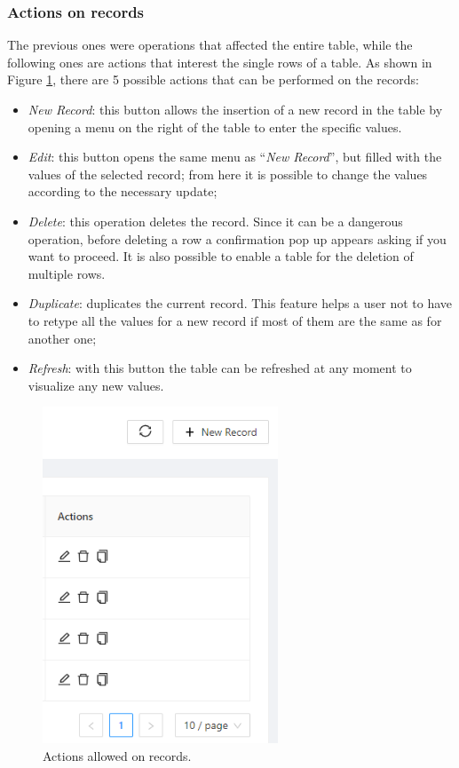 \subsubsection{Actions on records}
The previous ones were operations that affected the entire table, while the following ones are actions that interest the single rows of a table. As shown in Figure \ref{fig:actions}, there are 5 possible actions that can be performed on the records:
\begin{itemize}
    \item  \emph{New Record}:  this button allows the insertion of a new record in the table by opening a menu on the right of the table to enter the specific values.
    \item  \emph{Edit}: this button opens the same menu as ``\emph{New Record}'', but filled with the values of the selected record; from here it is possible to change the values according to the necessary update;
    \item  \emph{Delete}: this operation deletes the record. Since it can be a dangerous operation, before deleting a row a confirmation pop up appears asking if you want to proceed. It is also possible to enable a table for the deletion of multiple rows.
    \item  \emph{Duplicate}: duplicates the current record. This feature helps a user not to have to retype all the values for a new record if most of them are the same as for another one;
    \item \emph{Refresh}: with this button the table can be refreshed at any moment to visualize any new values.
\end{itemize}

\begin{figure}[!htb]
    \centering
    \includegraphics[width=7cm]{chapters/images/ch_3/FE/Common/actions.png}
    \caption{Actions allowed on records.}
    \label{fig:actions}
\end{figure}


